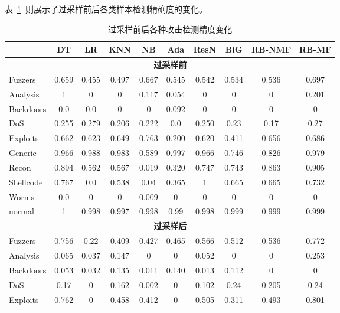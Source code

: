 表~\ref{tab:oversampling_performance}~则展示了过采样前后各类样本检测精确度的变化。
\begin{table}[htbp]
	\centering
	\caption{过采样前后各种攻击检测精度变化}
	\label{tab:oversampling_performance}
	\begin{tabular}{lccccccccc}
		\toprule
		          & DT    & LR    & KNN   & NB    & Ada   & ResN  & BiG   & RB-NMF & RB-MF \\
		\midrule
		\multicolumn{10}{c}{\textbf{过采样前}}                                             \\
		Fuzzers   & 0.659 & 0.455 & 0.497 & 0.667 & 0.545 & 0.542 & 0.534 & 0.536  & 0.697 \\
		Analysis  & 1     & 0     & 0     & 0.117 & 0.054 & 0     & 0     & 0      & 0.201 \\
		Backdoors & 0.0   & 0.0   & 0     & 0     & 0.092 & 0     & 0     & 0      & 0     \\
		DoS       & 0.255 & 0.279 & 0.206 & 0.222 & 0.0   & 0.250 & 0.23  & 0.17   & 0.27  \\
		Exploits  & 0.662 & 0.623 & 0.649 & 0.763 & 0.200 & 0.620 & 0.411 & 0.656  & 0.686 \\
		Generic   & 0.966 & 0.988 & 0.983 & 0.589 & 0.997 & 0.966 & 0.746 & 0.826  & 0.979 \\
		Recon     & 0.894 & 0.562 & 0.567 & 0.019 & 0.320 & 0.747 & 0.743 & 0.863  & 0.905 \\
		Shellcode & 0.767 & 0.0   & 0.538 & 0.04  & 0.365 & 1     & 0.665 & 0.665  & 0.732 \\
		Worms     & 0.0   & 0     & 0     & 0.009 & 0     & 0     & 0     & 0      & 0     \\
		normal    & 1     & 0.998 & 0.997 & 0.998 & 0.99  & 0.998 & 0.999 & 0.999  & 0.999 \\
		\midrule
		\multicolumn{10}{c}{\textbf{过采样后}}                                             \\
		Fuzzers   & 0.756 & 0.22  & 0.409 & 0.427 & 0.465 & 0.566 & 0.512 & 0.536  & 0.772 \\
		Analysis  & 0.065 & 0.037 & 0.147 & 0     & 0     & 0.052 & 0     & 0      & 0.253 \\
		Backdoors & 0.053 & 0.032 & 0.135 & 0.011 & 0.140 & 0.013 & 0.112 & 0      & 0     \\
		DoS       & 0.17  & 0     & 0.162 & 0.002 & 0     & 0.102 & 0.24  & 0.205  & 0.24  \\
		Exploits  & 0.762 & 0     & 0.458 & 0.412 & 0     & 0.505 & 0.311 & 0.493  & 0.801 \\

\end{tabular}
\end{table}
